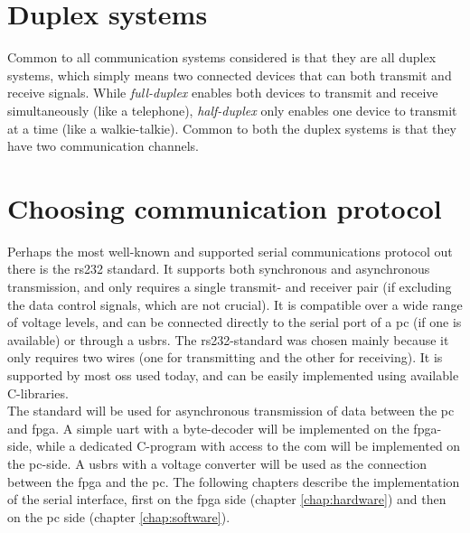 \documentclass[main.tex]{subfiles}
\begin{document}
\section{Duplex systems}

Common to all communication systems considered is that they are all duplex systems, which simply means two connected devices that can both transmit and receive signals. While \textit{full-duplex} enables both devices to transmit and receive simultaneously (like a telephone), \textit{half-duplex} only enables one device to transmit at a time (like a walkie-talkie). Common to both the duplex systems is that they have two communication channels. 

\section{Choosing communication protocol}
Perhaps the most well-known and supported serial communications protocol out there is the \acrshort{rs232} standard. It supports both synchronous and asynchronous transmission, and only requires a single transmit- and receiver pair (if excluding the data control signals, which are not crucial). It is compatible over a wide range of voltage levels, and can be connected directly to the serial port of a \acrshort{pc} (if one is available) or through a \gls{usbrs}. The \acrshort{rs232}-standard was chosen mainly because it only requires two wires (one for transmitting and the other for receiving). It is supported by most \glspl{os} used today, and can be easily implemented using available C-libraries.\\

The standard will be used for asynchronous transmission of data between the \acrshort{pc} and \gls{fpga}. A simple \gls{uart} with a byte-decoder will be implemented on the \gls{fpga}-side, while a dedicated C-program with access to the \gls{com} will be implemented on the \acrshort{pc}-side. A \gls{usbrs} with a voltage converter will be used as the connection between the \gls{fpga} and the \acrshort{pc}. The following chapters describe the implementation of the serial interface, first on the \gls{fpga} side (chapter \ref{chap:hardware}) and then on the \gls{pc} side (chapter \ref{chap:software}).

\end{document}
